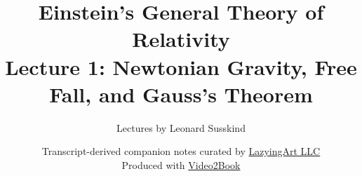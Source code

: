 \documentclass[11pt,oneside]{book}
\begin{document}
\hypersetup{pageanchor=false}
\frontmatter
\title{Einstein's General Theory of Relativity\\[0.45em]
\large Lecture 1: Newtonian Gravity, Free Fall, and Gauss's Theorem}
\author{Lectures by Leonard Susskind}
\date{Transcript-derived companion notes curated by
\href{https://lazying.art}{LazyingArt LLC}\\[0.35em]
\small Produced with
\href{https://github.com/lachlanchen/Video2Book}{Video2Book}}
\maketitle
\hypersetup{pageanchor=true}
\mainmatter

\end{document}

